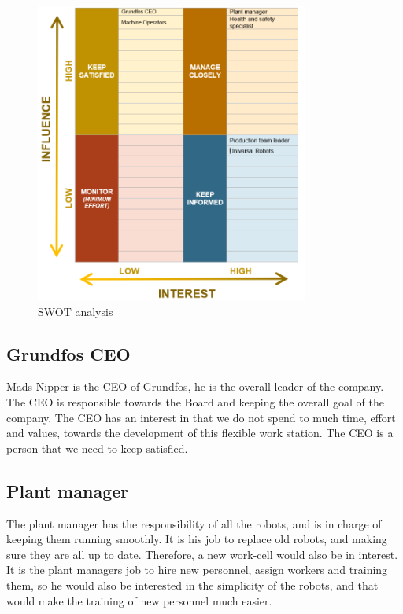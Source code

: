 \begin{figure}[h]
    \centering
    \includegraphics[width=9cm]{StakeholderAnalysis/SWOT.PNG}
    \caption{SWOT analysis}
    \label{fig:SWOT analysis}
\end{figure}

\subsection{Grundfos CEO}\label{ch:grundfosas-CEO}
Mads Nipper is the CEO of Grundfos, he is the overall leader of the company. The CEO is responsible towards the Board and keeping the overall goal of the company. The CEO has an interest in that we do not spend to much time, effort and values, towards the development of this flexible work station. The CEO is a person that we need  to keep satisfied.\\

\subsection{Plant manager}\label{ch:Plant-manager} 
The plant manager has the responsibility of all the robots, and is in charge of keeping them running smoothly. It is his job to replace old robots, and making sure they are all up to date. Therefore, a new work-cell would also be in interest. It is the plant managers job to hire new personnel, assign workers and training them, so he would also be interested in the simplicity of the robots, and that would make the training of new personnel much easier. \\

